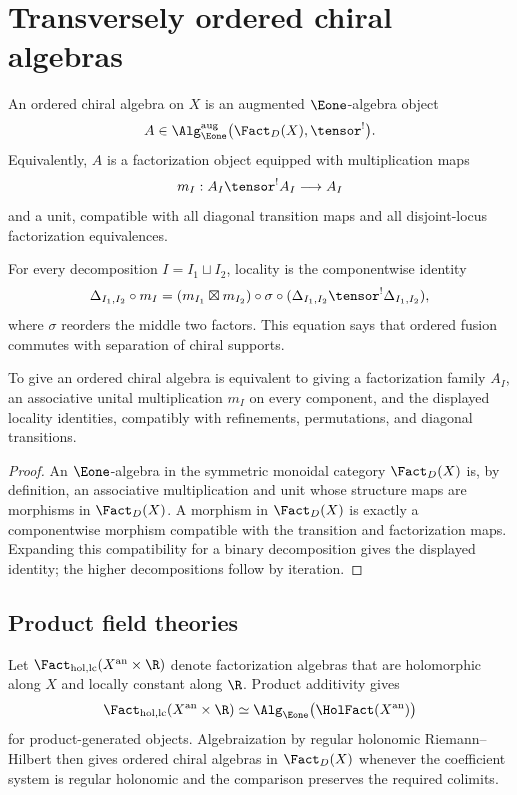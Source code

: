 \chapter{Transversely ordered chiral algebras}
\begin{definition}
An ordered chiral algebra on $X$ is an augmented $\Eone$-algebra object
\[
 A\in \Alg_{\Eone}^{\mathrm{aug}}\bigl(\Fact_D(X),\tensor^!\bigr).
\]
Equivalently, $A$ is a factorization object equipped with multiplication maps
\[
 m_I:A_I\tensor^!A_I\longrightarrow A_I
\]
and a unit, compatible with all diagonal transition maps and all disjoint-locus factorization equivalences.
\end{definition}

For every decomposition $I=I_1\sqcup I_2$, locality is the componentwise identity
\[
 \Delta_{I_1,I_2}\circ m_I
 = (m_{I_1}\boxtimes m_{I_2})\circ\sigma\circ
   (\Delta_{I_1,I_2}\tensor^!\Delta_{I_1,I_2}),
\]
where $\sigma$ reorders the middle two factors. This equation says that ordered fusion commutes with separation of chiral supports.

\begin{theorem}\label{cywhole:locality-recognition}
To give an ordered chiral algebra is equivalent to giving a factorization family $A_I$, an associative unital multiplication $m_I$ on every component, and the displayed locality identities, compatibly with refinements, permutations, and diagonal transitions.
\end{theorem}
\begin{proof}
An $\Eone$-algebra in the symmetric monoidal category $\Fact_D(X)$ is, by definition, an associative multiplication and unit whose structure maps are morphisms in $\Fact_D(X)$. A morphism in $\Fact_D(X)$ is exactly a componentwise morphism compatible with the transition and factorization maps. Expanding this compatibility for a binary decomposition gives the displayed identity; the higher decompositions follow by iteration.
\end{proof}

\section{Product field theories}
Let $\Fact_{\mathrm{hol,lc}}(X^{\mathrm{an}}\times\R)$ denote factorization algebras that are holomorphic along $X$ and locally constant along $\R$. Product additivity gives
\[
 \Fact_{\mathrm{hol,lc}}(X^{\mathrm{an}}\times\R)
 \simeq
 \Alg_{\Eone}\bigl(\HolFact(X^{\mathrm{an}})\bigr)
\]
for product-generated objects. Algebraization by regular holonomic Riemann--Hilbert then gives ordered chiral algebras in $\Fact_D(X)$ whenever the coefficient system is regular holonomic and the comparison preserves the required colimits.

